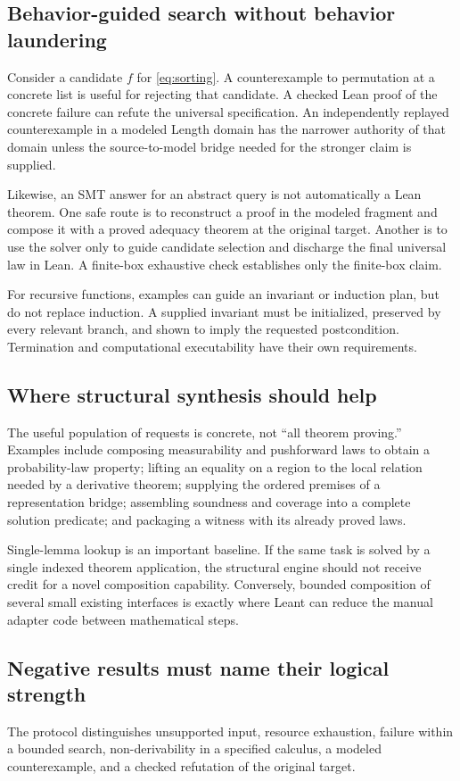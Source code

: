 \documentclass[11pt,a4paper]{article}
\newcommand{\code}[1]{\texttt{\detokenize{#1}}}
\theoremstyle{definition}
\begin{document}
\subsection{Behavior-guided search without behavior laundering}
Consider a candidate $f$ for \eqref{eq:sorting}. A counterexample to permutation
at a concrete list is useful for rejecting that candidate. A checked Lean
proof of the concrete failure can refute the universal specification. An
independently replayed counterexample in a modeled Length domain has the
narrower authority of that domain unless the source-to-model bridge needed for
the stronger claim is supplied.

Likewise, an SMT answer \code{unsat} for an abstract query is not automatically
a Lean theorem. One safe route is to reconstruct a proof in the modeled
fragment and compose it with a proved adequacy theorem at the original target.
Another is to use the solver only to guide candidate selection and discharge
the final universal law in Lean. A finite-box exhaustive check establishes
only the finite-box claim.

For recursive functions, examples can guide an invariant or induction plan,
but do not replace induction. A supplied invariant must be initialized,
preserved by every relevant branch, and shown to imply the requested
postcondition. Termination and computational executability have their own
requirements.

\subsection{Where structural synthesis should help}
The useful population of requests is concrete, not ``all theorem proving.''
Examples include composing measurability and pushforward laws to obtain a
probability-law property; lifting an equality on a region to the local relation
needed by a derivative theorem; supplying the ordered premises of a
representation bridge; assembling soundness and coverage into a complete
solution predicate; and packaging a witness with its already proved laws.

Single-lemma lookup is an important baseline. If the same task is solved by a
single indexed theorem application, the structural engine should not receive
credit for a novel composition capability. Conversely, bounded composition of
several small existing interfaces is exactly where Leant can reduce the
manual adapter code between mathematical steps.

\subsection{Negative results must name their logical strength}
The protocol distinguishes unsupported input, resource exhaustion, failure
within a bounded search, non-derivability in a specified calculus, a modeled
counterexample, and a checked refutation of the original target.
\end{document}
